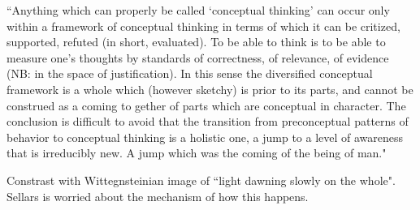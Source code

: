 ``Anything which can properly be called `conceptual thinking' can occur only within a framework of conceptual thinking in terms of which it can be critized, supported, refuted (in short, evaluated). To be able to think is to be able to measure one's thoughts by standards of correctness, of relevance, of evidence (NB: in the space of justification). In this sense the diversified conceptual framework is a whole which (however sketchy) is prior to its parts, and cannot be construed as a coming to gether of parts which are conceptual in character. The conclusion is difficult to avoid that the transition from preconceptual patterns of behavior to conceptual thinking is a holistic one, a jump to a level of awareness that is irreducibly new. A jump which was the coming of the being of man."

Constrast with Wittegnsteinian image of ``light dawning slowly on the whole". Sellars is worried about the mechanism of how this happens.
